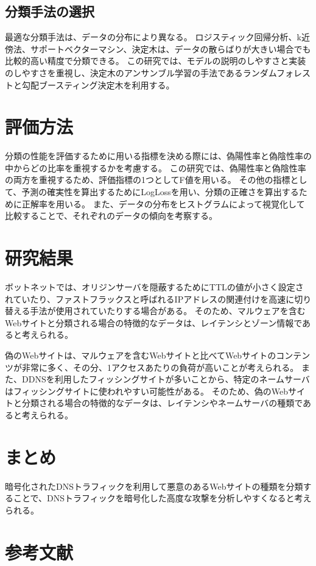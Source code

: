 \documentclass[twocolumn,article]{jlreq}
\begin{document}
\subsection{分類手法の選択}
最適な分類手法は、データの分布により異なる。
ロジスティック回帰分析、k近傍法、サポートベクターマシン、決定木は、データの散らばりが大きい場合でも比較的高い精度で分類できる。
この研究では、モデルの説明のしやすさと実装のしやすさを重視し、決定木のアンサンブル学習の手法であるランダムフォレストと勾配ブースティング決定木を利用する。

\section{評価方法}
分類の性能を評価するために用いる指標を決める際には、偽陽性率と偽陰性率の中からどの比率を重視するかを考慮する。
この研究では、偽陽性率と偽陰性率の両方を重視するため、評価指標の1つとしてF値を用いる。
その他の指標として、予測の確実性を算出するためにLogLossを用い、分類の正確さを算出するために正解率を用いる。
また、データの分布をヒストグラムによって視覚化して比較することで、それぞれのデータの傾向を考察する。

\section{研究結果}
ボットネットでは、オリジンサーバを隠蔽するためにTTLの値が小さく設定されていたり、ファストフラックスと呼ばれるIPアドレスの関連付けを高速に切り替える手法が使用されていたりする場合がある。
そのため、マルウェアを含むWebサイトと分類される場合の特徴的なデータは、レイテンシとゾーン情報であると考えられる。

偽のWebサイトは、マルウェアを含むWebサイトと比べてWebサイトのコンテンツが非常に多く、その分、1アクセスあたりの負荷が高いことが考えられる。
また、DDNSを利用したフィッシングサイトが多いことから、特定のネームサーバはフィッシングサイトに使われやすい可能性がある。
そのため、偽のWebサイトと分類される場合の特徴的なデータは、レイテンシやネームサーバの種類であると考えられる。


\section{まとめ}
暗号化されたDNSトラフィックを利用して悪意のあるWebサイトの種類を分類することで、DNSトラフィックを暗号化した高度な攻撃を分析しやすくなると考えられる。

\section*{参考文献}





\end{document}
